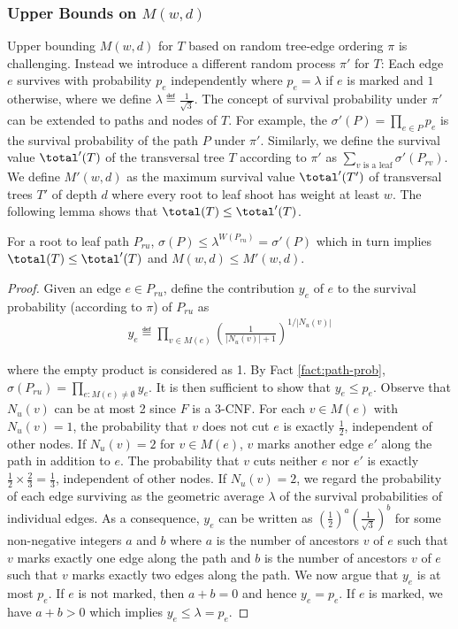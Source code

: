 \subsubsection{Upper Bounds on $M(w,d)$}
Upper bounding $M(w,d)$ for $T$ based on random tree-edge ordering $\pi$
is challenging. 
Instead we introduce a different
random process $\pi'$ for $T$: Each edge $e$ survives with probability $p_e$ independently
where $p_e = \lambda$ if $e$ is marked and $1$ otherwise,
where we define 
$\lambda \eqdef \frac{1}{\sqrt{3}}$.
The concept of survival probability under $\pi'$
can be extended to paths and nodes of $T$.
For example, the $\sigma'(P) = \prod_{e\in P} p_e$ is the survival probability
of the path $P$ under $\pi'$. 
Similarly, we define the survival value $\total'(T)$ of the transversal tree $T$ according to $\pi'$ as $\sum_{v\text{ is a leaf}} \sigma'(P_{rv})$. 
We define $M'(w,d)$ as the maximum survival value $\total'(T')$ of transversal trees $T'$
of depth $d$ where every root to leaf shoot has weight at least $w$.
The following lemma shows that $\total(T)\leq \total'(T)$.

\begin{lemma}
\label{path-pessim}
For a root to leaf path $P_{ru}$, 
$\sigma(P) \le \lambda^{W(P_{ru})} = \sigma'(P)$ which in turn implies $\total(T)\leq \total'(T)$
and $M(w,d)\leq M'(w,d)$. 

\end{lemma}

\begin{proof}
Given an edge $e \in P_{ru}$, define the contribution $y_e$ of $e$ to the
	survival probability (according to $\pi$) of $P_{ru}$ as 
\begin{align*}
y_e \eqdef \prod_{v \in M(e)}\left(\frac{1}{|N_u(v)|+1}\right)^{1/|N_u(v)|}
\end{align*}

where the empty product is considered as 1.
By Fact \ref{fact:path-prob}, $\sigma(P_{ru}) = \prod_{e : M(e) \ne \emptyset} y_e$. It is then sufficient to show 
that $y_e \le p_e$. 
Observe that $N_u(v)$ can be at most 2 since $F$ is a $3$-CNF.
For each $v \in M(e)$ with $N_u(v) =1$, the probability that $v$ does not cut $e$
is exactly $\frac{1}{2}$, independent of other nodes.
If $N_u(v)=2$ for $v\in M(e)$, $v$ marks another edge 
$e'$ along the path in addition to $e$.
The probability that $v$ cuts neither $e$
nor $e'$ is exactly $\frac{1}{2}\times\frac{2}{3}=\frac{1}{3}$, independent of other nodes.
If $N_u(v)=2$, we regard the probability of each edge surviving 
as the geometric average $\lambda$ of the survival probabilities 
of individual edges.
As a consequence, $y_e$ can be written 
as $(\frac{1}{2})^a (\frac{1}{\sqrt{3}})^b$
for some non-negative integers $a$ and $b$ 
where $a$ is the number of ancestors $v$ of $e$ such 
that $v$ marks exactly one edge along the path
and $b$ is the number of ancestors $v$ of $e$ such 
that $v$ marks exactly two edges along the path.
We now argue that $y_e$ is at most $p_e$.
If $e$ is not marked, then $a+b=0$ and hence $y_e=p_e$.
If $e$ is marked, we have $a+b>0$ which implies $y_e\leq \lambda = p_e$.
\end{proof}

